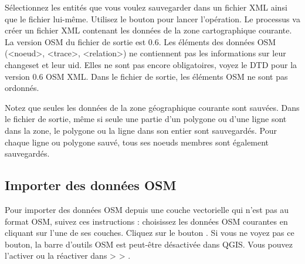 Sélectionnez les entités que vous voulez sauvegarder dans un fichier XML ainsi que le fichier lui-même. Utilisez le bouton  pour lancer l'opération. Le processus va créer un fichier XML contenant les données de la zone cartographique courante. La version OSM du fichier de sortie est 0.6. Les éléments des données OSM (<noeud>, <trace>, <relation>) ne contiennent pas les informations sur leur changeset et leur uid. Elles ne sont pas encore obligatoires, voyez le DTD pour la version 0.6 OSM XML. Dans le fichier de sortie, les éléments OSM ne sont pas ordonnés.

Notez que seules les données de la zone géographique courante sont sauvées. Dans le fichier de sortie, même si seule une partie d'un polygone ou d'une ligne sont dans la zone, le polygone ou la ligne dans son entier sont sauvegardés. Pour chaque ligne ou polygone sauvé, tous ses noeuds membres sont également sauvegardés.

\subsection{Importer des données OSM} 

Pour importer des données OSM depuis une couche vectorielle qui n'est pas au format OSM, suivez ces instructions : choisissez les données OSM courantes en cliquant sur l'une de ses couches. Cliquez sur le bouton . Si vous ne voyez pas ce bouton, la barre d'outils OSM est peut-être désactivée dans QGIS. Vous pouvez l'activer ou la réactiver dans  >  > .

